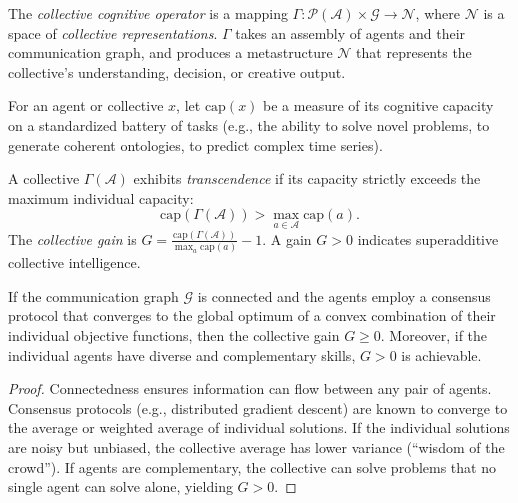 \begin{definition}
The \emph{collective cognitive operator} is a mapping $\Gamma: \mathcal{P}(\mathcal{A}) \times \mathcal{G} \to \mathcal{N}$, where $\mathcal{N}$ is a space of \emph{collective representations}. $\Gamma$ takes an assembly of agents and their communication graph, and produces a metastructure $\mathcal{N}$ that represents the collective's understanding, decision, or creative output.
\end{definition}

\begin{definition}
For an agent or collective $x$, let $\text{cap}(x)$ be a measure of its cognitive capacity on a standardized battery of tasks (e.g., the ability to solve novel problems, to generate coherent ontologies, to predict complex time series).
\end{definition}

\begin{definition}[Transcendence]
A collective $\Gamma(\mathcal{A})$ exhibits \emph{transcendence} if its capacity strictly exceeds the maximum individual capacity:
\[
\text{cap}(\Gamma(\mathcal{A})) > \max_{a \in \mathcal{A}} \text{cap}(a).
\]
The \emph{collective gain} is $G = \frac{\text{cap}(\Gamma(\mathcal{A}))}{\max_a \text{cap}(a)} - 1$. A gain $G > 0$ indicates superadditive collective intelligence.
\end{definition}

\begin{theorem}
\label{thm:superadditivity}
If the communication graph $\mathcal{G}$ is connected and the agents employ a consensus protocol that converges to the global optimum of a convex combination of their individual objective functions, then the collective gain $G \ge 0$. Moreover, if the individual agents have diverse and complementary skills, $G > 0$ is achievable.
\end{theorem}
\begin{proof}
Connectedness ensures information can flow between any pair of agents. Consensus protocols (e.g., distributed gradient descent) are known to converge to the average or weighted average of individual solutions. If the individual solutions are noisy but unbiased, the collective average has lower variance (``wisdom of the crowd''). If agents are complementary, the collective can solve problems that no single agent can solve alone, yielding $G > 0$.
\end{proof}

